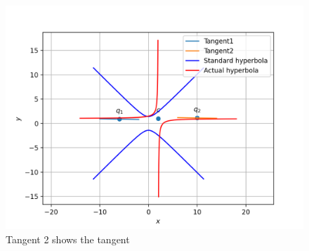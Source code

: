 \documentclass[journal,12pt,twocolumn]{IEEEtran}
\begin{document}
  \begin{figure}[h!]
	\centering
	\includegraphics[width=\columnwidth]{Assignment_7.png}
	\caption{Tangent 2 shows the tangent}
	\label{myfig}
\end{figure}
 
\end{document}
